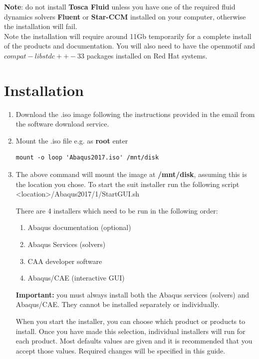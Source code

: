 \documentclass[10pt,a4paper,oneside]{article}
\begin{document}
\textbf{Note}: do not install \textbf{Tosca Fluid} unless you have one of the  required fluid dynamics solvers \textbf{Fluent} or \textbf{Star-CCM} installed on your computer, otherwise the installation will fail.
\\
Note the installation will require around 11Gb temporarily for a complete install of the products and documentation. You will also need to have the openmotif and $compat-libstdc++-33$ packages installed on Red Hat systems.


\section{Installation}
\begin{enumerate}
\item Download the .iso image following the instructions provided in the email from the software download service.
\item Mount the .iso file e.g. as \textbf{root} enter 
\begin{lstlisting} 
mount -o loop 'Abaqus2017.iso' /mnt/disk 
\end{lstlisting}
\item The above command will mount the image at \textbf{/mnt/disk}, assuming this is the location you chose. To start the suit installer run the following script <location>/Abaqus2017/1/StartGUI.sh

There are 4 installers which need to be run in the following order:
\begin{enumerate}
\item Abaqus documentation (optional)
\item Abaqus Services (solvers)
\item CAA developer software
\item Abaqus/CAE (interactive GUI)
\end{enumerate}

\textbf{Important:} you must always install both the Abaqus services (solvers) and Abaqus/CAE. They cannot be installed separately or individually.

When you start the installer, you can choose which product or products to install. Once you have made this selection, individual installers will run for each product. Most defaults values are given and it is recommended that you accept those values. Required changes will be specified in this guide. \bigskip


\end{enumerate}
\end{document}
